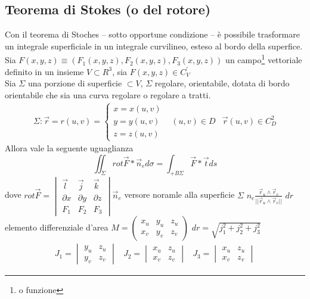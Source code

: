 \subsection{Teorema di Stokes (o del rotore)\label{stokes}}
Con il teorema di Stoches -- sotto opportune condizione --  è possibile trasformare un
integrale superficiale in un integrale curvilineo, esteso al bordo della superfice.\\
Sia $F(x,y,z)\equiv (F_1(x,y,z),F_2(x,y,z),F_3(x,y,z))$ un campo\footnote{o funzione}
vettoriale definito in un insieme $V\subset R^3$, sia $F(x,y,z)\in C_V^\prime$\\
Sia $\Sigma$ una porzione di superficie $\subset V$, $\Sigma$ regolare, orientabile,
dotata di bordo orientabile che sia una curva regolare o regolare a tratti.
\begin{eqnarray*}
  \Sigma: \vec{r}=r(u,v)=\begin{cases}
                           x=x(u,v)\\
                           y=y(u,v)\\
                           z=z(u,v)
                         \end{cases} & (u,v)\in D & \vec{r}(u,v)\in C_D^2
\end{eqnarray*}
Allora vale la seguente uguaglianza
\begin{equation*}
  \iint_\Sigma rot \vec{F}*\vec{n}_e d\sigma=\int_{+B\Sigma}\vec{F}*\vec{t}ds
\end{equation*}
dove $rot \vec{F}=\begin{vmatrix}
                    \vec{l} & \vec{j} & \vec{k} \\
                    \partial x & \partial y & \partial z\\
                    F_1 & F_2 & F_3
                  \end{vmatrix}\vec{n}_e$ versore noramle alla superficie $\Sigma$
                  $n_e\frac{\vec{r}_u\wedge \vec{r}_v}{||\vec{r}_u \wedge \vec{r}_v||}$
                  $dr$ elemento differenziale d'area $M=\begin{pmatrix}
                                                          x_u & y_u & z_u \\
                                                          x_v & y_v & z_v
                                                        \end{pmatrix}$
                                                        $dr=\sqrt{j_1^2+j_2^2+j_3^2}$
\begin{eqnarray*}
  J_1=\begin{vmatrix}
        y_u &z_u\\
        y_v &z_v
      \end{vmatrix}
  & J_2=\begin{vmatrix}
        x_u &z_u\\
        x_v &z_v
        \end{vmatrix}
  & J_3=\begin{vmatrix}
        x_u &z_u\\
        x_v &z_v
      \end{vmatrix}
\end{eqnarray*}
